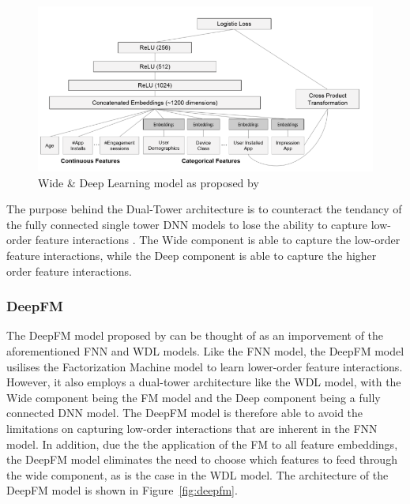\documentclass{mldsmsc}
\begin{document}
\begin{figure}[h]
\centering
\includegraphics[]{../figures/wdl.png}
\caption{Wide \& Deep Learning model as proposed by \cite{RefWorks:cheng2016wide}}
\label{fig:wdl}
\end{figure}

The purpose behind the Dual-Tower architecture is to counteract the tendancy of the fully connected
single tower DNN models to lose the ability to capture low-order feature interactions \citep{RefWorks:zhang2021deep}.
The Wide component is able to capture the low-order feature interactions, while the Deep component is able to capture
the higher order feature interactions.

\subsubsection{DeepFM}

The DeepFM model proposed by \cite{RefWorks:guo2017deepfm:} can be thought of as an
imporvement of the aforementioned FNN \citep{RefWorks:zhang2016deep} and WDL \citep{RefWorks:cheng2016wide} models.
Like the FNN model, the DeepFM model usilises the Factorization Machine model \citep{RefWorks:rendle2010factorization}
to learn lower-order feature interactions. However, it also employs a dual-tower architecture
like the WDL model, with the Wide component being the FM model and the Deep component being a fully connected
DNN model. The DeepFM model is therefore able to avoid the limitations on capturing low-order
interactions that are inherent in the FNN model. In addition, due the the application of the FM to all
feature embeddings, the DeepFM model eliminates the need to choose which features 
to feed through the wide component, as is the case in the WDL model. The architecture of the DeepFM model is shown 
in Figure~\ref{fig:deepfm}.
\end{document}
